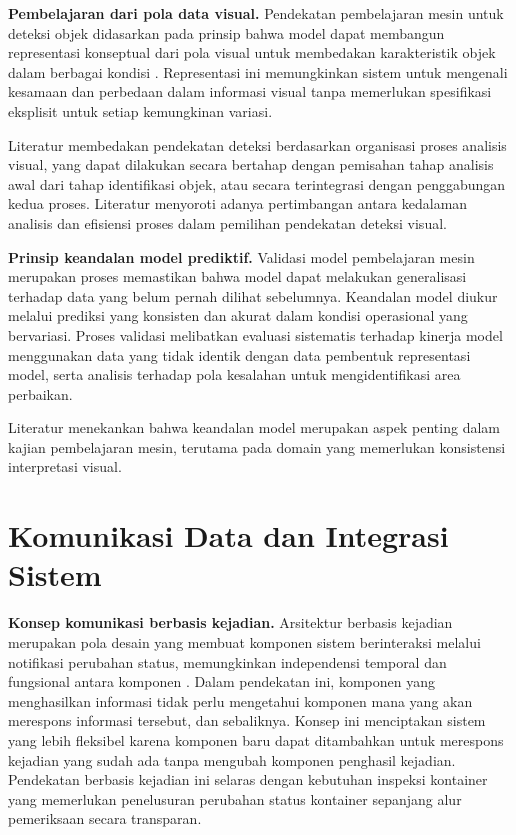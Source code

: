 \textbf{Pembelajaran dari pola data visual.}
Pendekatan pembelajaran mesin untuk deteksi objek didasarkan pada prinsip bahwa model dapat membangun representasi konseptual dari pola visual untuk membedakan karakteristik objek dalam berbagai kondisi \autocite{goodfellow2016}. Representasi ini memungkinkan sistem untuk mengenali kesamaan dan perbedaan dalam informasi visual tanpa memerlukan spesifikasi eksplisit untuk setiap kemungkinan variasi.

Literatur membedakan pendekatan deteksi berdasarkan organisasi proses analisis visual, yang dapat dilakukan secara bertahap dengan pemisahan tahap analisis awal dari tahap identifikasi objek, atau secara terintegrasi dengan penggabungan kedua proses. Literatur menyoroti adanya pertimbangan antara kedalaman analisis dan efisiensi proses dalam pemilihan pendekatan deteksi visual.

\textbf{Prinsip keandalan model prediktif.}
Validasi model pembelajaran mesin merupakan proses memastikan bahwa model dapat melakukan generalisasi terhadap data yang belum pernah dilihat sebelumnya. Keandalan model diukur melalui prediksi yang konsisten dan akurat dalam kondisi operasional yang bervariasi. Proses validasi melibatkan evaluasi sistematis terhadap kinerja model menggunakan data yang tidak identik dengan data pembentuk representasi model, serta analisis terhadap pola kesalahan untuk mengidentifikasi area perbaikan.

Literatur menekankan bahwa keandalan model merupakan aspek penting dalam kajian pembelajaran mesin, terutama pada domain yang memerlukan konsistensi interpretasi visual.

\section{Komunikasi Data dan Integrasi Sistem}

\textbf{Konsep komunikasi berbasis kejadian.}
Arsitektur berbasis kejadian merupakan pola desain yang membuat komponen sistem berinteraksi melalui notifikasi perubahan status, memungkinkan independensi temporal dan fungsional antara komponen \autocite{hohpe2003}. Dalam pendekatan ini, komponen yang menghasilkan informasi tidak perlu mengetahui komponen mana yang akan merespons informasi tersebut, dan sebaliknya. Konsep ini menciptakan sistem yang lebih fleksibel karena komponen baru dapat ditambahkan untuk merespons kejadian yang sudah ada tanpa mengubah komponen penghasil kejadian. Pendekatan berbasis kejadian ini selaras dengan kebutuhan inspeksi kontainer yang memerlukan penelusuran perubahan status kontainer sepanjang alur pemeriksaan secara transparan.

